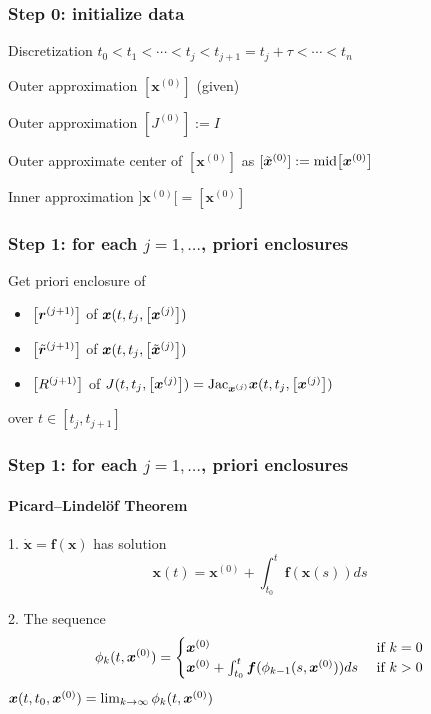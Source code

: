 \documentclass{beamer}
\newcommand{\iterx}[1]{\bm{x}^{(#1)}}
\newcommand{\itertx}[1]{\tilde{\bm{x}}^{(#1)}}
\newcommand{\iterJ}[1]{J^{(#1)}}
\newcommand{\intervalbox}[1]{\arr{\bm{x}^{(#1)}}}
\newcommand{\tintervalbox}[1]{\arr{\tilde{\bm{x}}^{(#1)}}}
\newcommand{\enclosure}[1]{\arr{\bm{r}^{(#1)}}}
\newcommand{\tenclosure}[1]{\arr{\tilde{\bm{r}}^{(#1)}}}
\newcommand{\Jac}[1]{\text{Jac}_{#1}}
\newcommand{\Enclosure}[1]{\arr{R^{(#1)}}}
\begin{document}
\begin{frame}
    \frametitle{Step 0: initialize data}

    Discretization $t_0 < t_1 < \cdots < t_j < t_{j+1} = t_j + \tau < \cdots < t_n$

    \vspace{3mm}
    Outer approximation $[\iterx{0}]$ (given)

    \vspace{3mm}
    Outer approximation $[\iterJ{0}] := I$

    \vspace{3mm}
    Outer approximate center of $[\iterx{0}]$ as $[\itertx{0}] := \text{mid}{\intervalbox{0}}$

    \vspace{3mm}
    Inner approximation $]\iterx{0}[ = [\iterx{0}]$

\end{frame}

\begin{frame}
    \frametitle{Step 1: for each $j = 1,\ldots$, priori enclosures}
    
    Get priori enclosure of
    \begin{itemize}
        \item $\enclosure{j+1}$ of \; $\bm{x}(t, t_j, \intervalbox{j})$
        \item $\tenclosure{j+1}$ of \; $\bm{x}(t, t_j, \tintervalbox{j})$
        \item $\Enclosure{j+1}$ of \; $J(t, t_j, \intervalbox{j}) = \Jac{\iterx{j}} \bm{x}(t, t_j, \intervalbox{j})$
    \end{itemize}
    over $t \in [t_j, t_{j+1}]$

\end{frame}


\begin{frame}
    \frametitle{Step 1: for each $j = 1,\ldots$, priori enclosures}
    \framesubtitle{Picard–Lindelöf Theorem}
    
    1. $\dot{\bm{x}} = \bm{f}(\bm{x})$ has solution
    $$\bm{x}(t) = \iterx{0} + \int^t_{t_0} \bm{f}(\bm{x}(s))ds$$

    \vspace{3mm}
    2. The sequence
    $$\phi_k(t, \iterx{0}) = \begin{cases}
        \iterx{0} & \iftext k = 0\\
            \iterx{0} + \int^t_{t_0} \bm{f}(\phi_{k-1}(s, \iterx{0}))ds & \iftext k > 0\\
    \end{cases}$$
    $\bm{x}(t, t_0, \iterx{0}) = \lim_{k \ra \infty} \phi_k(t, \iterx{0})$

\end{frame}
\end{document}
